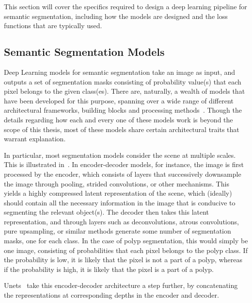     This section will cover the specifics required to design a deep learning pipeline for semantic segmentation, including how the models are designed and the loss functions that are typically used. 
    
    \subsection{Semantic Segmentation Models}
    Deep Learning models for semantic segmentation take an image as input, and outputs a set of segmentation masks consisting of probability value(s) that each pixel belongs to the given class(es). There are, naturally, a wealth of models that have been developed for this purpose, spanning over a wide range of different architectural frameworks, building blocks and processing methods~\cite{semantic_segmentation_survey, segmentation_survey}. Though the details regarding how each and every one of these models work is beyond the scope of this thesis, most of these models share certain architectural traits that warrant explanation. 
    
    In particular, most segmentation models consider the scene at multiple scales. This is illustrated in~. In encoder-decoder models, for instance, the image is first processed by the encoder, which consists of layers that successively downsample the image through pooling, strided convolutions, or other mechanisms. This yields a highly compressed latent representation of the scene, which (ideally) should contain all the necessary information in the image that is conducive to segmenting the relevant object(s). The decoder then takes this latent representation, and through layers such as deconvolutions, atrous convolutions, pure upsampling, or similar methods generate some number of segmentation masks, one for each class. In the case of polyp segmentation, this would simply be one image, consisting of probabilities that each pixel belongs to the polyp class. If the probability is low, it is likely that the pixel is not a part of a polyp, whereas if the probability is high, it is likely that the pixel is a part of a polyp. 

    Unets~\cite{unet} take this encoder-decoder architecture a step further, by concatenating the representations at corresponding depths in the encoder and decoder. 
    
